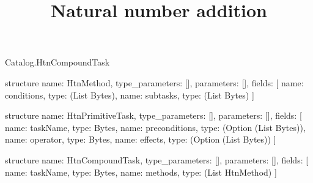 \begin{lexlean}{Catalog.HtnCompoundTask}
\title{Natural number addition}
\begin{semanticmodule}
structure{
  name: HtnMethod,
  type_parameters: [],
  parameters: [],
  fields: [
    {name: conditions, type: (List Bytes)},
    {name: subtasks, type: (List Bytes)}
  ]
}

structure{
  name: HtnPrimitiveTask,
  type_parameters: [],
  parameters: [],
  fields: [
    {name: taskName, type: Bytes},
    {name: preconditions, type: (Option (List Bytes))},
    {name: operator, type: Bytes},
    {name: effects, type: (Option (List Bytes))}
  ]
}

structure{
  name: HtnCompoundTask,
  type_parameters: [],
  parameters: [],
  fields: [
    {name: taskName, type: Bytes},
    {name: methods, type: (List HtnMethod)}
  ]
}
\end{semanticmodule}
\end{lexlean}
